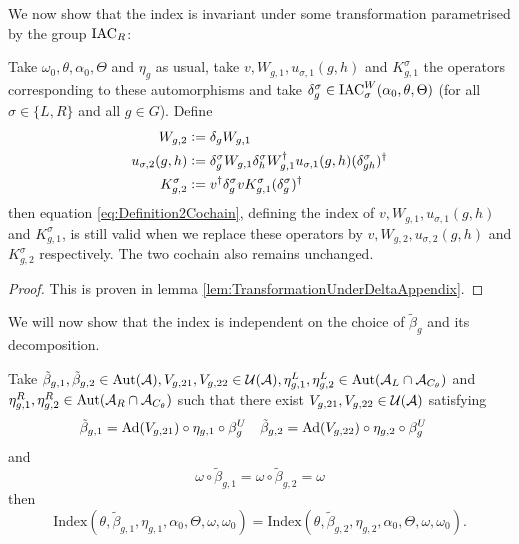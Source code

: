 \documentclass[12pt,a4paper,twoside]{article}
\numberwithin{equation}{section}
\begin{document}
We now show that the index is invariant under some transformation parametrised by the group $\textrm{IAC}_R$:
\begin{lemma}\label{lem:TransformationUnderDelta}
	Take $\omega_0,\theta,\alpha_0,\Theta$ and $\eta_g$ as usual, take $v,W_{g,1},u_{\sigma,1}(g,h)$ and $K_{g,1}^\sigma$ the operators corresponding to these automorphisms and take $\delta^\sigma_g\in\textrm{IAC}_\sigma^W(\alpha_0,\theta,\Theta)$ (for all $\sigma\in\{L,R\}$ and all $g\in G$). Define
	\begin{align}
		W_{g,2}&\vcentcolon=\delta_g W_{g,1}\\
		u_{\sigma,2}(g,h)&\vcentcolon= \delta_g^\sigma W_{g,1}\delta_h^\sigma W_{g,1}^\dagger u_{\sigma,1}(g,h)(\delta_{gh}^\sigma)^\dagger\\
		K^\sigma_{g,2}&\vcentcolon= v^\dagger \delta_g^\sigma v K_{g,1}^\sigma (\delta_g^\sigma)^\dagger
	\end{align}
	then equation \eqref{eq:Definition2Cochain}, defining the index of $v,W_{g,1},u_{\sigma,1}(g,h)$ and $K_{g,1}^\sigma$, is still valid when we replace these operators by $v,W_{g,2},u_{\sigma,2}(g,h)$ and $K_{g,2}^\sigma$ respectively. The two cochain also remains unchanged.
\end{lemma}
\begin{proof}
	This is proven in lemma \ref{lem:TransformationUnderDeltaAppendix}.
\end{proof}
We will now show that the index is independent on the choice of $\tilde{\beta}_g$ and its decomposition.
\begin{lemma}\label{lem:InvarianceUnderChoiceBeta}
	Take $\tilde{\beta}_{g,1},\tilde{\beta}_{g,2}\in\Aut{\AA},V_{g,21},V_{g,22}\in\UU(\AA),\eta_{g,1}^L,\eta_{g,2}^L\in \Aut{\AA_L\cap\AA_{C_\theta}}$ and $\eta_{g,1}^R,\eta_{g,2}^R\in \Aut{\AA_R\cap\AA_{C_\theta}}$ such that there exist $V_{g,21},V_{g,22}\in\mathcal U(\mathcal A)$ satisfying
	\begin{align}\label{eq:InvarianceUnderChoiceBetaTwoBetas}
		\tilde{\beta}_{g,1}&=\Ad{V_{g,21}}\circ\eta_{g,1}\circ\beta^U_g&\tilde{\beta}_{g,2}&=\Ad{V_{g,22}}\circ\eta_{g,2}\circ\beta^U_g
	\end{align}
	and
	\begin{equation}
		\omega\circ\tilde{\beta}_{g,1}=\omega\circ\tilde{\beta}_{g,2}=\omega
	\end{equation}
	then
	\begin{equation}
		\textrm{Index}(\theta,\tilde{\beta}_{g,1},\eta_{g,1},\alpha_{0},\Theta,\omega,\omega_0)=\textrm{Index}(\theta,\tilde{\beta}_{g,2},\eta_{g,2},\alpha_{0},\Theta,\omega,\omega_0).
	\end{equation}
\end{lemma}
\end{document}

